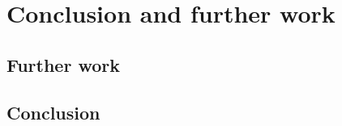 \chapter{Conclusion and further work}
\label{ch:conclusion}


\section{Further work}

\section{Conclusion}
 